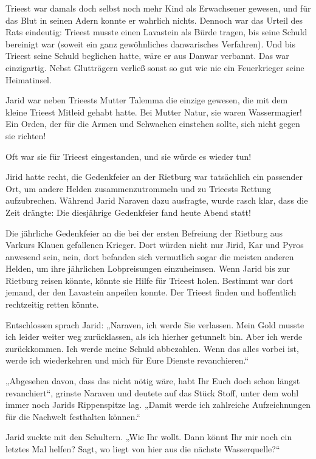 Trieest war damals doch selbst noch mehr Kind als Erwachsener gewesen, und für das Blut in seinen Adern konnte er wahrlich nichts. Dennoch war das Urteil des Rats eindeutig: Trieest musste einen Lavastein als Bürde tragen, bis seine Schuld bereinigt war (soweit ein ganz gewöhnliches danwarisches Verfahren). Und bis Trieest seine Schuld beglichen hatte, wäre er aus Danwar verbannt. Das war einzigartig. Nebst Glutträgern verließ sonst so gut wie nie ein Feuerkrieger seine Heimatinsel.

Jarid war neben Trieests Mutter Talemma die einzige gewesen, die mit dem kleine Trieest Mitleid gehabt hatte. Bei Mutter Natur, sie waren Wassermagier! Ein Orden, der für die Armen und Schwachen einstehen sollte, sich nicht gegen sie richten!

Oft war sie für Trieest eingestanden, und sie würde es wieder tun!

Jirid hatte recht, die Gedenkfeier an der Rietburg war tatsächlich ein passender Ort, um andere Helden zusammenzutrommeln und zu Trieests Rettung aufzubrechen. Während Jarid Naraven dazu ausfragte, wurde rasch klar, dass die Zeit drängte: Die diesjährige Gedenkfeier fand heute Abend statt!

Die jährliche Gedenkfeier an die bei der ersten Befreiung der Rietburg aus Varkurs Klauen gefallenen Krieger. Dort würden nicht nur Jirid, Kar und Pyros anwesend sein, nein, dort befanden sich vermutlich sogar die meisten anderen Helden, um ihre jährlichen Lobpreisungen einzuheimsen. Wenn Jarid bis zur Rietburg reisen könnte, könnte sie Hilfe für Trieest holen. Bestimmt war dort jemand, der den Lavastein anpeilen konnte. Der Trieest finden und hoffentlich rechtzeitig retten könnte.

Entschlossen sprach Jarid: „Naraven, ich werde Sie verlassen. Mein Gold musste ich leider weiter weg zurücklassen, als ich hierher getunnelt bin. Aber ich werde zurückkommen. Ich werde meine Schuld abbezahlen. Wenn das alles vorbei ist, werde ich wiederkehren und mich für Eure Dienste revanchieren.“

„Abgesehen davon, dass das nicht nötig wäre, habt Ihr Euch doch schon längst revanchiert“, grinste Naraven und deutete auf das Stück Stoff, unter dem wohl immer noch Jarids Rippenspitze lag. „Damit werde ich zahlreiche Aufzeichnungen für die Nachwelt festhalten können.“

Jarid zuckte mit den Schultern. „Wie Ihr wollt. Dann könnt Ihr mir noch ein letztes Mal helfen? Sagt, wo liegt von hier aus die nächste Wasserquelle?“

